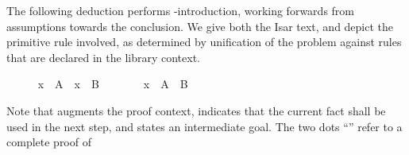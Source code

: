 \begin{isabellebody}
\begin{isamarkuptext}
  \medskip The following deduction performs -introduction,
  working forwards from assumptions towards the conclusion.  We give
  both the Isar text, and depict the primitive rule involved, as
  determined by unification of the problem against rules that are
  declared in the library context.%
\end{isamarkuptext}%
\isamarkuptrue%
%
\medskip\begin{minipage}{0.6\textwidth}
%
\isadelimproof
\ \ \ \ %
\endisadelimproof
%
\isatagproof
{}\isamarkupfalse%
\ {}x\ {}\ A{}\ \ {}x\ {}\ B{}\isanewline
\ \ \ \ \isamarkupfalse%
\ \isamarkupfalse%
\ {}x\ {}\ A\ {}\ B{}\ \isamarkupfalse%
%
\endisatagproof
{\isafoldproof}%
%
\isadelimproof
%
\endisadelimproof
%
\end{minipage}\begin{minipage}{0.4\textwidth}
%
\begin{isamarkuptext}%
%
\end{isamarkuptext}%
\isamarkuptrue%
%
\end{minipage}
%
\begin{isamarkuptext}%
\medskip\noindent Note that \hyperlink{command.assume}{\mbox{}} augments the proof
  context, \hyperlink{command.then}{\mbox{}} indicates that the current fact shall be
  used in the next step, and \hyperlink{command.have}{\mbox{}} states an intermediate
  goal.  The two dots ``\hyperlink{command.ddot}{\mbox{}}'' refer to a complete proof of

\end{isamarkuptext}
\end{isabellebody}
